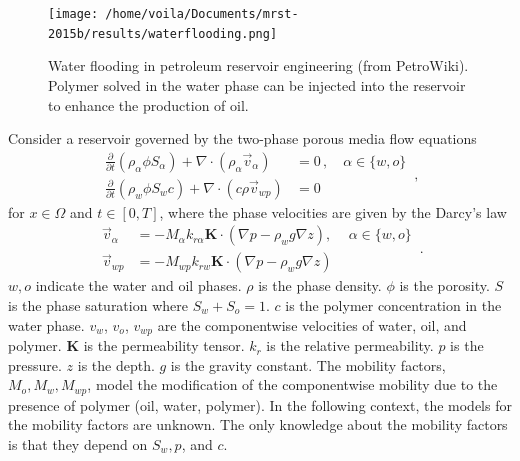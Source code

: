 \begin{figure}[htbp]
    \begin{center}
        \texttt{[image: /home/voila/Documents/mrst-2015b/results/waterflooding.png]}
        \caption{Water flooding in petroleum reservoir engineering (from PetroWiki). Polymer 
                 solved in the water phase can be injected into the reservoir to enhance the
                 production of oil.}
        \label{fig: polymer sketch}
    \end{center}
\end{figure}

Consider a reservoir governed by the two-phase porous media flow equations
\begin{equation}\begin{split}
    \frac{\partial }{\partial t} \left(\rho_\alpha \phi S_\alpha \right) + \nabla \cdot
    \left( \rho_\alpha \vec{v}_{\alpha} \right) &= 0\,, \quad \alpha \in \{w,o\}\\
    \frac{\partial}{\partial t}\left( \rho_w \phi S_w c \right) + \nabla \cdot
    \left( c \rho \vec{v}_{wp}\right) &= 0        
    \end{split}\,,
    \label{eqn: two phase polymer}
\end{equation}
for $x\in \Omega$ and $t\in [0,T]$,
where the phase velocities are given by the Darcy's law
\begin{equation}\begin{split}
    \vec{v}_\alpha &= - {M_\alpha} k_{r\alpha} \boldsymbol{K} \cdot (\nabla p - \rho_w g \nabla z), \, \quad \alpha \in \{w,o\}\\
    \vec{v}_{wp} &= -{M_{wp}} k_{rw} \boldsymbol{K} \cdot (\nabla p - \rho_{w} g \nabla z)
\end{split}\,.
\label{eqn: darcy law}
\end{equation}
$w, o$ indicate the water and oil phases.
$\rho$ is the phase density. $\phi$ is the porosity. $S$ is the phase saturation where
$S_w+S_o=1$.
$c$ is the polymer concentration in the water phase. $v_{w}$, $v_{o}$, 
$v_{wp}$ are the componentwise velocities of water, oil, and polymer. 
$\boldsymbol{K}$
is the permeability tensor. $k_{r}$ is the relative permeability. $p$ is the pressure. $z$ is the depth.
$g$ is the gravity constant. The mobility factors, $M_o, M_w, M_{wp}$, 
model the modification of the componentwise mobility due to the presence of polymer (oil,
water, polymer).
In the following context, the models for the mobility factors are unknown. The only 
knowledge about the mobility factors is that they depend on $S_w, p$, and $c$.
\\

